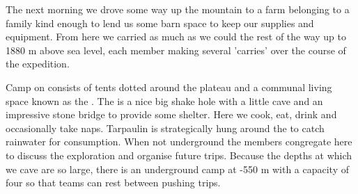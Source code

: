

The next morning we drove some way up the mountain to a farm belonging to a family kind enough
to lend us some barn space to keep our supplies and equipment. From here we carried as much as we
could the rest of the way up  to 1880 m above sea level, each member making several 'carries'
over the course of the expedition.


Camp on  consists of tents dotted around the plateau and a communal living space known as
the . The  is a nice big shake hole with a little cave and an impressive stone bridge to provide
some shelter. Here we cook, eat, drink and occasionally take naps. Tarpaulin is strategically hung
around the  to catch rainwater for consumption. When not underground the members congregate
here to discuss the exploration and organise future trips. Because the depths at which we cave
are so large, there is an underground camp at -550 m with a capacity of four so that teams can rest
between pushing trips.


